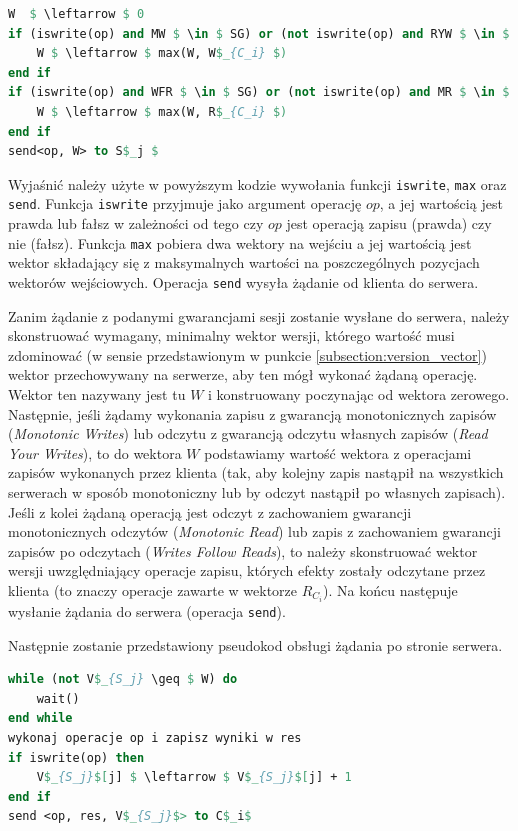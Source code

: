 \begin{lstlisting}[language=Pascal, caption=Pseudokod procedury wysyłania żądania przez klienta w protokole VsSG, mathescape=true]
W  $ \leftarrow $ 0
if (iswrite(op) and MW $ \in $ SG) or (not iswrite(op) and RYW $ \in $ SG) then
    W $ \leftarrow $ max(W, W$_{C_i} $)
end if
if (iswrite(op) and WFR $ \in $ SG) or (not iswrite(op) and MR $ \in $ SG) then
    W $ \leftarrow $ max(W, R$_{C_i} $)
end if
send<op, W> to S$_j $
\end{lstlisting}

Wyjaśnić należy użyte w powyższym kodzie wywołania funkcji \texttt{iswrite}, \texttt{max} oraz \texttt{send}. Funkcja \texttt{iswrite} przyjmuje jako argument operację $ op $, a jej wartością jest prawda lub fałsz w zależności od tego czy $ op $ jest operacją zapisu (prawda) czy nie (fałsz). Funkcja \texttt{max} pobiera dwa wektory na wejściu a jej wartością jest wektor składający się z maksymalnych wartości na poszczególnych pozycjach wektorów wejściowych. Operacja \texttt{send} wysyła żądanie od klienta do serwera.

Zanim żądanie z podanymi gwarancjami sesji zostanie wysłane do serwera, należy skonstruować wymagany, minimalny wektor wersji, którego wartość musi zdominować (w sensie przedstawionym w punkcie \ref{subsection:version_vector}) wektor przechowywany na serwerze, aby ten mógł wykonać żądaną operację. Wektor ten nazywany jest tu $ W $ i konstruowany poczynając od wektora zerowego. Następnie, jeśli żądamy wykonania zapisu z gwarancją monotonicznych zapisów (\textit{Monotonic Writes}) lub odczytu z gwarancją odczytu własnych zapisów (\textit{Read Your Writes}), to do wektora $ W $ podstawiamy wartość wektora z operacjami zapisów wykonanych przez klienta (tak, aby kolejny zapis nastąpił na wszystkich serwerach w sposób monotoniczny lub by odczyt nastąpił po własnych zapisach). Jeśli z kolei żądaną operacją jest odczyt z zachowaniem gwarancji monotonicznych odczytów (\textit{Monotonic Read}) lub zapis z zachowaniem gwarancji zapisów po odczytach (\textit{Writes Follow Reads}), to należy skonstruować wektor wersji uwzględniający operacje zapisu, których efekty zostały odczytane przez klienta (to znaczy operacje zawarte w wektorze $ R_{C_i} $). Na końcu następuje wysłanie żądania do serwera (operacja \texttt{send}).

Następnie zostanie przedstawiony pseudokod obsługi żądania po stronie serwera.

\begin{lstlisting}[language=Pascal, caption=Pseudokod procedury obsługi żądania po stronie serwera w protokole VsSG, mathescape=true]
while (not V$_{S_j} \geq $ W) do
    wait()
end while
wykonaj operacje op i zapisz wyniki w res
if iswrite(op) then
    V$_{S_j}$[j] $ \leftarrow $ V$_{S_j}$[j] + 1
end if
send <op, res, V$_{S_j}$> to C$_i$
\end{lstlisting}

